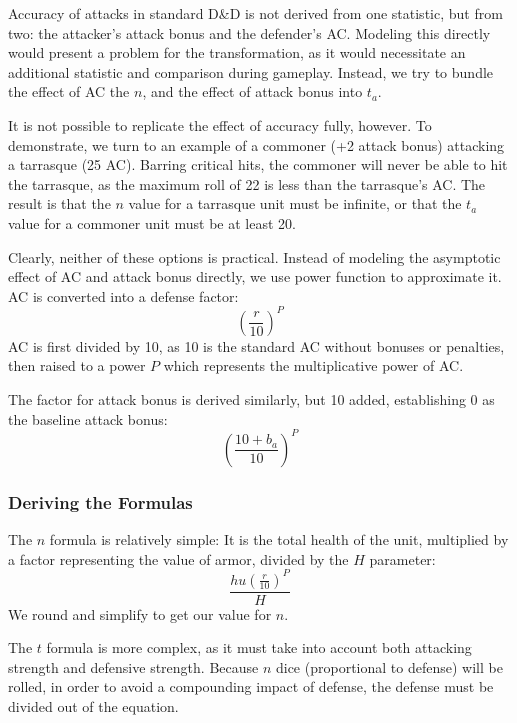 \documentclass[twocolumn]{article}
\begin{document}
Accuracy of attacks in standard D\&D is not derived from one statistic,
but from two: the attacker's attack bonus and the defender's AC.
Modeling this directly would present a problem for the transformation,
as it would necessitate an additional statistic and comparison during gameplay.
Instead, we try to bundle the effect of AC the $n$,
and the effect of attack bonus into $t_a$.

It is not possible to replicate the effect of accuracy fully, however.
To demonstrate, we turn to an example of a commoner (+2 attack bonus)
attacking a tarrasque (25 AC).
Barring critical hits, the commoner will never be able to hit the tarrasque,
as the maximum roll of 22 is less than the tarrasque's AC.
The result is that the $n$ value for a tarrasque unit must be infinite,
or that the $t_a$ value for a commoner unit must be at least 20.

Clearly, neither of these options is practical.
Instead of modeling the asymptotic effect of AC and attack bonus directly,
we use power function to approximate it.
AC is converted into a defense factor:
\[
    \left(\frac{r}{10}\right)^P
\]
AC is first divided by 10,
as 10 is the standard AC without bonuses or penalties,
then raised to a power $P$ which represents the multiplicative power of AC.

The factor for attack bonus is derived similarly,
but 10 added, establishing 0 as the baseline attack bonus:
\[
    \left(\frac{10 + b_a}{10}\right)^P
\]

\subsubsection{Deriving the Formulas}

The $n$ formula is relatively simple:
It is the total health of the unit,
multiplied by a factor representing the value of armor,
divided by the $H$ parameter:
\[
    \frac
        {h u (\frac{r}{10})^P}
        {H}
\]
We round and simplify to get our value for $n$.

The $t$ formula is more complex,
as it must take into account both attacking strength and defensive strength.
Because $n$ dice (proportional to defense) will be rolled,
in order to avoid a compounding impact of defense,
the defense must be divided out of the equation.
\end{document}
